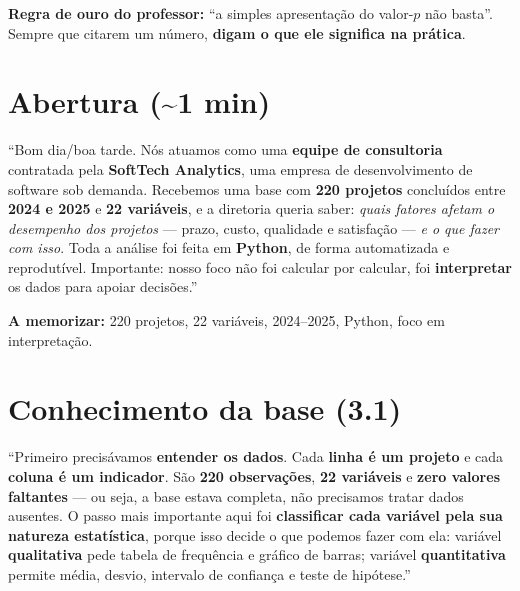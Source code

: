 \documentclass[a4paper, 11pt]{article}
\begin{document}
\begin{fala}
\textbf{Regra de ouro do professor:} ``a simples apresentação do valor-$p$ não basta''.
Sempre que citarem um número, \textbf{digam o que ele significa na prática}.
\end{fala}

\section{Abertura (\textasciitilde1 min)}

\begin{roteiro}
``Bom dia/boa tarde. Nós atuamos como uma \textbf{equipe de consultoria} contratada pela
\textbf{SoftTech Analytics}, uma empresa de desenvolvimento de software sob demanda. Recebemos
uma base com \textbf{220 projetos} concluídos entre \textbf{2024 e 2025} e \textbf{22
variáveis}, e a diretoria queria saber: \emph{quais fatores afetam o desempenho dos projetos}
--- prazo, custo, qualidade e satisfação --- \emph{e o que fazer com isso}. Toda a análise foi
feita em \textbf{Python}, de forma automatizada e reprodutível. Importante: nosso foco não foi
calcular por calcular, foi \textbf{interpretar} os dados para apoiar decisões.''
\end{roteiro}

\textbf{A memorizar:} 220 projetos, 22 variáveis, 2024--2025, Python, foco em interpretação.

\section{Conhecimento da base (3.1)}

\begin{roteiro}
``Primeiro precisávamos \textbf{entender os dados}. Cada \textbf{linha é um projeto} e cada
\textbf{coluna é um indicador}. São \textbf{220 observações}, \textbf{22 variáveis} e
\textbf{zero valores faltantes} --- ou seja, a base estava completa, não precisamos tratar
dados ausentes. O passo mais importante aqui foi \textbf{classificar cada variável pela sua
natureza estatística}, porque isso decide o que podemos fazer com ela: variável
\textbf{qualitativa} pede tabela de frequência e gráfico de barras; variável
\textbf{quantitativa} permite média, desvio, intervalo de confiança e teste de hipótese.''
\end{roteiro}
\end{document}
